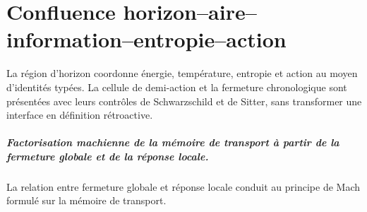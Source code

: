\chapter{Confluence horizon–aire–information–entropie–action}
\label{chap:parte-iv-69}

La région d’horizon coordonne énergie, température, entropie et action au moyen d’identités typées. La cellule de demi-action et la fermeture chronologique sont présentées avec leurs contrôles de Schwarzschild et de Sitter, sans transformer une interface en définition rétroactive.



\paragraph{Factorisation machienne de la mémoire de transport à partir de la fermeture globale et de la réponse locale.} La relation entre fermeture globale et réponse locale conduit au principe de Mach formulé sur la mémoire de transport.
